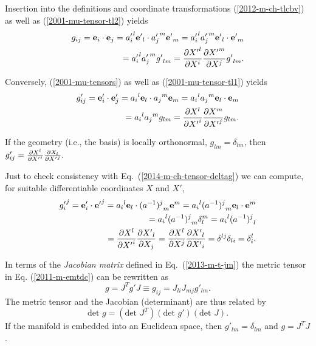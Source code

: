 Insertion into the definitions and coordinate transformations
(\ref{2012-m-ch-tlcbv}) as well as      (\ref{2001-mu-tensor-tl2})
yields
\begin{equation}
\begin{split}
g_{ij}={\bf e}_i\cdot {\bf e}_j
={a'_i}^l{\bf e'}_l\cdot {a'_j}^m{\bf e'}_m
={a'_i}^l {a'_j}^m {\bf e'}_l\cdot {\bf e'}_m \\
= {a'_i}^l {a'_j}^m {g'}_{lm}
= {\partial {X'}^l\over \partial X^i}{\partial {X'}^m\over \partial X^j} {g'}_{lm}
.
\label{2011-m-emtdc}
\end{split}
\end{equation}

Conversely,  (\ref{2001-mu-tensors}) as well as    (\ref{2001-mu-tensor-tl1})
yields
\begin{equation}
\begin{split}
g'_{ij}={\bf e}'_i\cdot {\bf e}'_j
={a_i}^l{\bf e}_l\cdot {a_j}^m{\bf e}_m
={a_i}^l {a_j}^m {\bf e}_l\cdot {\bf e}_m  \\
= {a_i}^l {a_j}^m {g}_{lm}
= {\partial {X}^l\over \partial {X'}^i}{\partial {X}^m\over \partial {X'}^j} {g}_{lm}
.
\end{split}
\end{equation}


If the geometry (i.e., the basis) is locally orthonormal, ${g}_{lm}=\delta_{lm}$,
then
$g'_{ij}={\partial {X}^l\over \partial {X'}^i}{\partial {X}_l\over \partial {X'}^j}$.

Just to check consistency with Eq.~(\ref{2014-m-ch-tensor-deltag}) we can compute,
for suitable differentiable coordinates $X$ and $X'$,
\begin{equation}
\begin{split}
{g'_i}^j={\bf e}'_i\cdot {{\bf e}'}^j
={a_i}^l{\bf e}_l\cdot {(a^{-1})^j}_m{\bf e}^m
={a_i}^l {(a^{-1})^j}_m {\bf e}_l\cdot {\bf e}^m  \\
= {a_i}^l {(a^{-1})^j}_m \delta_l^m
= {a_i}^l {(a^{-1})^j}_l  \\
= {\partial {X}^l\over \partial {X'}^i}{\partial {X'}_l\over \partial {X}_j}
= {\partial {X}^l\over \partial {X}^j}{\partial {X'}_l\over \partial {X'}_i}
= \delta^{lj}\delta_{li}
= \delta^l_i
.
\end{split}
\end{equation}

In terms of the
{\em  Jacobian matrix} defined in Eq.~(\ref{2013-m-t-jm})
the metric tensor in Eq. (\ref{2011-m-emtdc})
can be rewritten as
\begin{equation}
g = J^T g' J
\equiv g_{ij}= J_{li}J_{mj}g'_{lm}
.
\label{2011-m-emtdcJ}
\end{equation}
The metric tensor and the Jacobian (determinant)
are thus related by
\begin{equation}
\textrm{det }g = (\textrm{det }J^T) (\textrm{det } g')(\textrm{det } J)
.
\label{2011-m-emtdcJd}
\end{equation}
If the manifold is embedded into an Euclidean space,
then $g'_{lm}=\delta_{lm}$
and  $g = J^T  J $.

